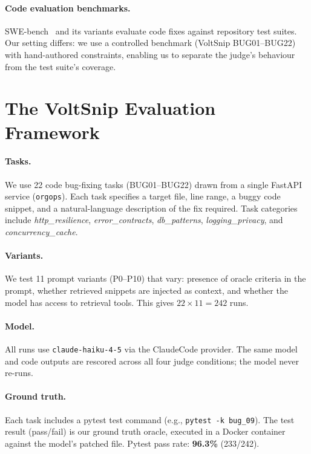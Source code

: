 \documentclass[11pt]{article}
\begin{document}
\paragraph{Code evaluation benchmarks.}
SWE-bench~\citep{jimenez2024swebench} and its variants evaluate code fixes
against repository test suites.
Our setting differs: we use a controlled benchmark (VoltSnip BUG01--BUG22)
with hand-authored constraints, enabling us to separate the judge's
behaviour from the test suite's coverage.

\section{The VoltSnip Evaluation Framework}
\label{sec:framework}

\paragraph{Tasks.}
We use 22 code bug-fixing tasks (BUG01--BUG22) drawn from a single
FastAPI service (\texttt{orgops}).
Each task specifies a target file, line range, a buggy code snippet, and
a natural-language description of the fix required.
Task categories include \textit{http\_resilience},
\textit{error\_contracts}, \textit{db\_patterns},
\textit{logging\_privacy}, and \textit{concurrency\_cache}.

\paragraph{Variants.}
We test 11 prompt variants (P0--P10) that vary: presence of oracle criteria
in the prompt, whether retrieved snippets are injected as context, and
whether the model has access to retrieval tools.
This gives $22 \times 11 = 242$ runs.

\paragraph{Model.}
All runs use \texttt{claude-haiku-4-5} via the ClaudeCode provider.
The same model and code outputs are rescored across all four judge
conditions; the model never re-runs.

\paragraph{Ground truth.}
Each task includes a pytest test command
(e.g., \texttt{pytest -k bug\_09}).
The test result (pass/fail) is our ground truth oracle, executed in a
Docker container against the model's patched file.
Pytest pass rate: \textbf{96.3\%} (233/242).
\end{document}
